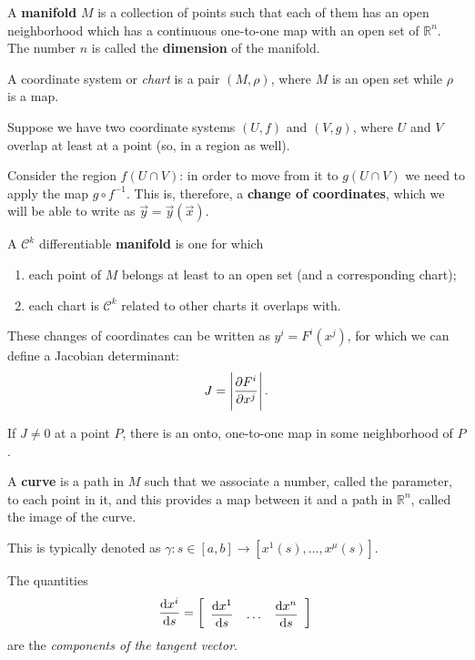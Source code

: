 \documentclass[main.tex]{subfiles}
\begin{document}
A \textbf{manifold} \(M\) is a collection of points such that each of them has an open neighborhood which has a continuous one-to-one map with an open set of \(\mathbb{R}^{n}\). 
The number \(n\) is called the \textbf{dimension} of the manifold.


A coordinate system or \emph{chart} is a pair \((M, \rho )\), where \(M\) is an open set while \(\rho \) is a map. 

Suppose we have two coordinate systems \((U, f)\) and \((V, g)\), where \(U\) and \(V\) overlap at least at a point (so, in a region as well). 

Consider the region \(f(U \cap V)\): in order to move from it to \(g(U \cap V)\) we need to apply the map \(g \circ f^{-1}\). 
This is, therefore, a \textbf{change of coordinates}, which we will be able to write as \(\vec{y} = \vec{y} (\vec{x})\). 

A \(\mathcal{C}^{k}\) differentiable \textbf{manifold} is one for which 
\begin{enumerate}
    \item each point of \(M\) belongs at least to an open set (and a corresponding chart); 
    \item each chart is \(\mathcal{C}^{k}\) related to other charts it overlaps with. 
\end{enumerate}

These changes of coordinates can be written as \(y^{i} = F^{i}(x^{j})\), for which we can define a Jacobian determinant: 
%
\begin{align}
J = \abs{\pdv{F^{i}}{x^{j}}} 
\,.
\end{align}

If \(J \neq 0\) at a point \(P\), there is an onto, one-to-one map in some neighborhood of \(P\). 

A \textbf{curve} is a path in \(M\) such that we associate a number, called the parameter, to each point in it, and this provides a map between it and a path in \(\mathbb{R}^{n}\), called the image of the curve. 

This is typically denoted as \(\gamma \colon s \in [a, b] \to [x^{1}(s), \dots, x^{\mu }(s)]\). 

The quantities 
%
\begin{align}
\dv{x^{i}}{s} = \left[\begin{array}{ccc}
\displaystyle \dv{x^{1}}{s} 
& \dots &
\displaystyle \dv{x^{n}}{s}
\end{array}\right]
\,
\end{align}
%
are the \emph{components of the tangent vector}. 
\end{document}
